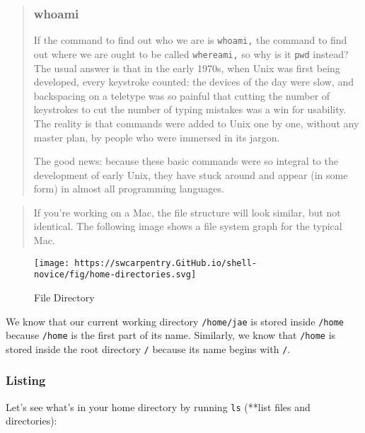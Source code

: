 \documentclass[
]{book}
\newenvironment{Shaded}{\begin{snugshade}}{\end{snugshade}}
\newcommand{\ExtensionTok}[1]{#1}
\newcommand{\FunctionTok}[1]{\textcolor[rgb]{0.00,0.00,0.00}{#1}}
\newcommand{\NormalTok}[1]{#1}
\begin{document}
\begin{quote}
\hypertarget{whoami}{%
\subsubsection{whoami}\label{whoami}}

If the command to find out who we are is \texttt{whoami,} the command to find out where we are ought to be called \texttt{whereami,} so why is it \texttt{pwd} instead? The usual answer is that in the early 1970s, when Unix was first being developed, every keystroke counted: the devices of the day were slow, and backspacing on a teletype was so painful that cutting the number of keystrokes to cut the number of typing mistakes was a win for usability. The reality is that commands were added to Unix one by one, without any master plan, by people who were immersed in its jargon.

The good news: because these basic commands were so integral to the development of early Unix, they have stuck around and appear (in some form) in almost all programming languages.
\end{quote}

\begin{quote}
If you're working on a Mac, the file structure will look similar, but not identical. The following image shows a file system graph for the typical Mac.
\end{quote}

\begin{figure}
\centering
\texttt{[image: https://swcarpentry.GitHub.io/shell-novice/fig/home-directories.svg]}
\caption{File Directory}
\end{figure}

We know that our current working directory \texttt{/home/jae} is stored inside \texttt{/home} because \texttt{/home} is the first part of its name. Similarly, we know that \texttt{/home} is stored inside the root directory \texttt{/} because its name begins with \texttt{/}.

\hypertarget{listing}{%
\subsubsection{Listing}\label{listing}}

Let's see what's in your home directory by running \texttt{ls} (**list files and directories):

\begin{Shaded}
\end{Shaded}
\end{document}
